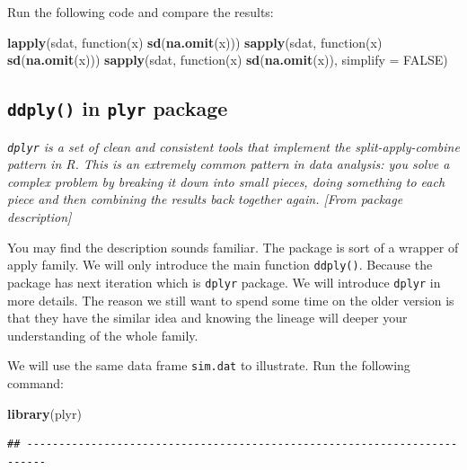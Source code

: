 \documentclass[]{book}
\newenvironment{Shaded}{\begin{snugshade}}{\end{snugshade}}
\newcommand{\KeywordTok}[1]{\textcolor[rgb]{0.13,0.29,0.53}{\textbf{{#1}}}}
\newcommand{\DataTypeTok}[1]{\textcolor[rgb]{0.13,0.29,0.53}{{#1}}}
\newcommand{\OtherTok}[1]{\textcolor[rgb]{0.56,0.35,0.01}{{#1}}}
\newcommand{\NormalTok}[1]{{#1}}
\theoremstyle{definition}
\theoremstyle{definition}
\theoremstyle{remark}
\begin{document}
Run the following code and compare the results:

\begin{Shaded}
\begin{Highlighting}[]
\KeywordTok{lapply}\NormalTok{(sdat, function(x) }\KeywordTok{sd}\NormalTok{(}\KeywordTok{na.omit}\NormalTok{(x)))}
\KeywordTok{sapply}\NormalTok{(sdat, function(x) }\KeywordTok{sd}\NormalTok{(}\KeywordTok{na.omit}\NormalTok{(x)))}
\KeywordTok{sapply}\NormalTok{(sdat, function(x) }\KeywordTok{sd}\NormalTok{(}\KeywordTok{na.omit}\NormalTok{(x)), }\DataTypeTok{simplify =} \OtherTok{FALSE}\NormalTok{)}
\end{Highlighting}
\end{Shaded}

\subsection{\texorpdfstring{\texttt{ddply()} in \texttt{plyr}
package}{ddply() in plyr package}}\label{ddply-in-plyr-package}

\emph{\texttt{dplyr} is a set of clean and consistent tools that
implement the split-apply-combine pattern in R. This is an extremely
common pattern in data analysis: you solve a complex problem by breaking
it down into small pieces, doing something to each piece and then
combining the results back together again. {[}From package
description{]}}

You may find the description sounds familiar. The package is sort of a
wrapper of apply family. We will only introduce the main function
\texttt{ddply()}. Because the package has next iteration which is
\texttt{dplyr} package. We will introduce \texttt{dplyr} in more
details. The reason we still want to spend some time on the older
version is that they have the similar idea and knowing the lineage will
deeper your understanding of the whole family.

We will use the same data frame \texttt{sim.dat} to illustrate. Run the
following command:

\begin{Shaded}
\begin{Highlighting}[]
\KeywordTok{library}\NormalTok{(plyr)}
\end{Highlighting}
\end{Shaded}

\begin{verbatim}
## -------------------------------------------------------------------------
\end{verbatim}
\end{document}
